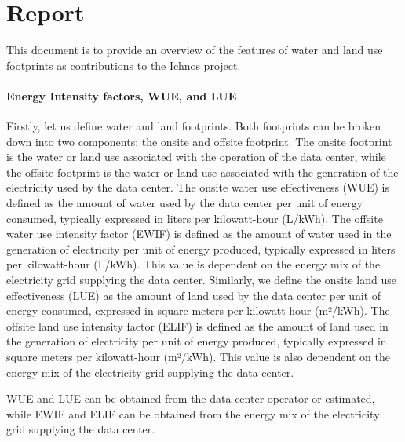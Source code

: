 \documentclass{article}
\begin{document}
\section{Report}

This document is to provide an overview of the features of water and land use footprints as contributions to the Ichnos project.
\paragraph{Energy Intensity factors, WUE, and LUE}
Firstly, let us define water and land footprints. Both footprints can be broken down into two components: the onsite and offsite footprint. The onsite footprint is the water or land use associated with the operation of the data center, while the offsite footprint is the water or land use associated with the generation of the electricity used by the data center.
The onsite water use effectiveness (WUE) is defined as the amount of water used by the data center per unit of energy consumed, typically expressed in liters per kilowatt-hour (L/kWh). 
The offsite water use intensity factor (EWIF) is defined as the amount of water used in the generation of electricity per unit of energy produced, typically expressed in liters per kilowatt-hour (L/kWh). This value is dependent on the energy mix of the electricity grid supplying the data center.
Similarly, we define the onsite land use effectiveness (LUE) as the amount of land used by the data center per unit of energy consumed, expressed in square meters per kilowatt-hour (m²/kWh).
The offsite land use intensity factor (ELIF) is defined as the amount of land used in the generation of electricity per unit of energy produced, typically expressed in square meters per kilowatt-hour (m²/kWh). This value is also dependent on the energy mix of the electricity grid supplying the data center.

WUE and LUE can be obtained from the data center operator or estimated, while EWIF and ELIF can be obtained from the energy mix of the electricity grid supplying the data center.
\end{document}
